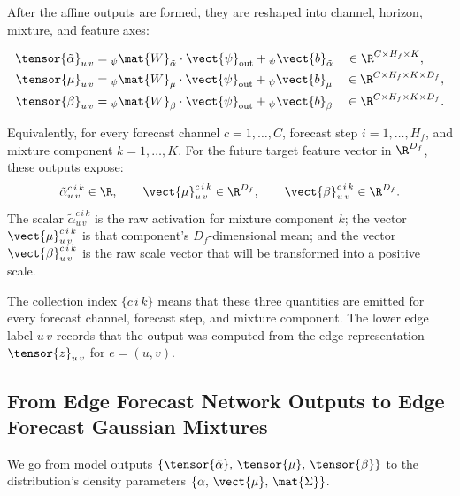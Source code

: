 After the affine outputs are formed, they are reshaped into channel, horizon,
mixture, and feature axes:

\[
  \begin{aligned}
    \tensor{\tilde{\alpha}}_{u\,v}
    &=
    {}_{\psi}\mat{W}_{\tilde{\alpha}}\cdot\vect{\psi}_{\mathrm{out}}
    +
    {}_{\psi}\vect{b}_{\tilde{\alpha}}
    \quad \in \R^{C \times H_f \times K},\\
    \tensor{\mu}_{u\,v}
    &=
    {}_{\psi}\mat{W}_{\mu}\cdot\vect{\psi}_{\mathrm{out}}
    +
    {}_{\psi}\vect{b}_{\mu}
    \quad \in \R^{C \times H_f \times K \times D_f},\\
    \tensor{\beta}_{u\,v}
    &=
    {}_{\psi}\mat{W}_{\beta}\cdot\vect{\psi}_{\mathrm{out}}
    +
    {}_{\psi}\vect{b}_{\beta}
    \quad \in \R^{C \times H_f \times K \times D_f}.
  \end{aligned}
\]

Equivalently, for every forecast channel $c=1,\ldots,C$, forecast step
$i=1,\ldots,H_f$, and mixture component $k=1,\ldots,K$.  For the future target feature vector in
$\R^{D_f}$, these outputs expose:
\[
  \tilde{\alpha}_{u\,v}^{c\,i\,k}\in\R,
  \qquad
  \vect{\mu}_{u\,v}^{c\,i\,k}\in\R^{D_f},
  \qquad
  \vect{\beta}_{u\,v}^{c\,i\,k}\in\R^{D_f}.
\]
The scalar
$\tilde{\alpha}_{u\,v}^{c\,i\,k}$ is the raw activation for mixture component
$k$; the vector $\vect{\mu}_{u\,v}^{c\,i\,k}$ is that component's
$D_f$-dimensional mean; and the vector $\vect{\beta}_{u\,v}^{c\,i\,k}$ is the
raw scale vector that will be transformed into a positive scale.

The collection index $\{c\,i\,k\}$ means that these three quantities are emitted
for every forecast channel, forecast step, and mixture component.  The lower
edge label ${u\,v}$ records that the output was computed from the edge
representation $\tensor{z}_{u\,v}$ for $e=(u,v)$.







\subsection{From Edge Forecast Network Outputs to Edge Forecast Gaussian Mixtures}
\label{subsec:from-mdn-to-mixtures}

We go from model outputs 
$\{\tensor{\tilde{\alpha}},\,\tensor{\mu},\,\tensor{\beta}\}$
to the distribution's density parameters $\{\alpha,\,\vect{\mu},\,\mat{\Sigma}\}$.

